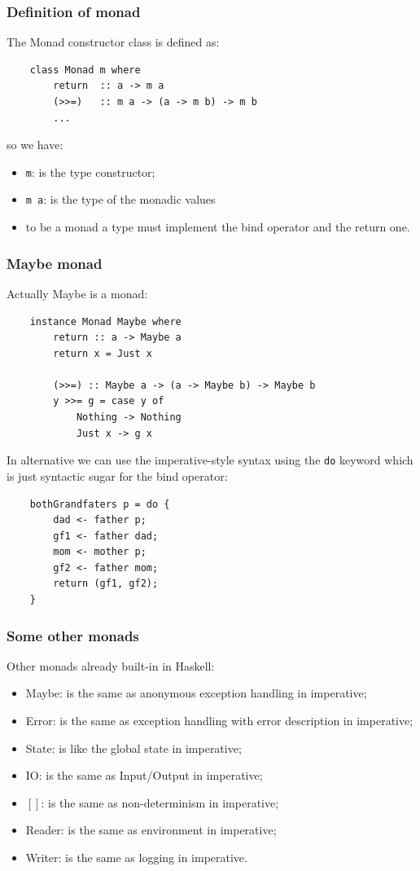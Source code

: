 \subsubsection{Definition of monad}
The Monad constructor class is defined as:
\begin{verbatim}
    class Monad m where
        return  :: a -> m a
        (>>=)   :: m a -> (a -> m b) -> m b
        ...
\end{verbatim}
so we have:
\begin{itemize}
    \item \verb|m|: is the type constructor;
    \item \verb|m a|: is the type of the monadic values
    \item to be a monad a type must implement the bind operator and the return one.
\end{itemize}

\subsubsection{Maybe monad}
Actually Maybe is a monad:
\begin{verbatim}
    instance Monad Maybe where
        return :: a -> Maybe a
        return x = Just x

        (>>=) :: Maybe a -> (a -> Maybe b) -> Maybe b
        y >>= g = case y of
            Nothing -> Nothing
            Just x -> g x
\end{verbatim}

In alternative we can use the imperative-style syntax using the \verb|do| keyword which is just syntactic sugar for the bind operator:
\begin{verbatim}
    bothGrandfaters p = do {
        dad <- father p;
        gf1 <- father dad;
        mom <- mother p;
        gf2 <- father mom;
        return (gf1, gf2);
    }
\end{verbatim}

\subsubsection{Some other monads}
Other monads already built-in in Haskell:
\begin{itemize}
    \item Maybe: is the same as anonymous exception handling in imperative;
    \item Error: is the same as exception handling with error description in imperative;
    \item State: is like the global state in imperative;
    \item IO: is the same as Input/Output in imperative;
    \item $[]$: is the same as non-determinism in imperative;
    \item Reader: is the same as environment in imperative;
    \item Writer: is the same as logging in imperative.
\end{itemize}

